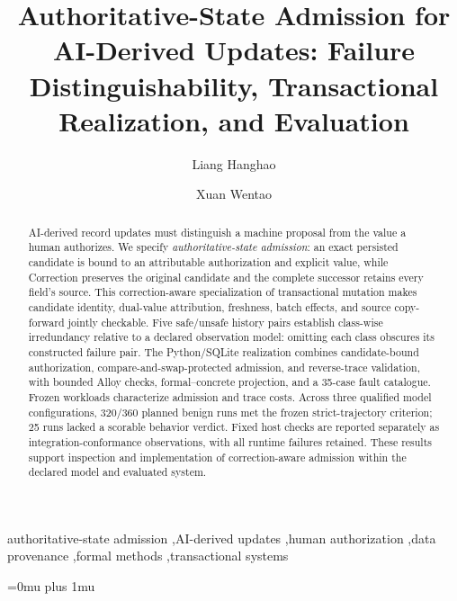 \documentclass[preprint,12pt,authoryear]{elsarticle}
\begin{document}
\begin{frontmatter}

\title{Authoritative-State Admission for AI-Derived Updates: Failure Distinguishability, Transactional Realization, and Evaluation}

\author[inst1]{Liang Hanghao}
\author[inst1]{Xuan Wentao}

\begin{abstract}
AI-derived record updates must distinguish a machine proposal from the value a human authorizes. We specify \emph{authoritative-state admission}: an exact persisted candidate is bound to an attributable authorization and explicit value, while Correction preserves the original candidate and the complete successor retains every field's source. This correction-aware specialization of transactional mutation makes candidate identity, dual-value attribution, freshness, batch effects, and source copy-forward jointly checkable. Five safe/unsafe history pairs establish class-wise irredundancy relative to a declared observation model: omitting each class obscures its constructed failure pair. The Python/SQLite realization combines candidate-bound authorization, compare-and-swap-protected admission, and reverse-trace validation, with bounded Alloy checks, formal--concrete projection, and a 35-case fault catalogue. Frozen workloads characterize admission and trace costs. Across three qualified model configurations, 320/360 planned benign runs met the frozen strict-trajectory criterion; 25 runs lacked a scorable behavior verdict. Fixed host checks are reported separately as integration-conformance observations, with all runtime failures retained. These results support inspection and implementation of correction-aware admission within the declared model and evaluated system.
\end{abstract}

\begin{keyword}
authoritative-state admission \sep AI-derived updates \sep human authorization \sep data provenance \sep formal methods \sep transactional systems
\end{keyword}

\end{frontmatter}














\begingroup
\Urlmuskip=0mu plus 1mu\relax

\endgroup
\end{document}
